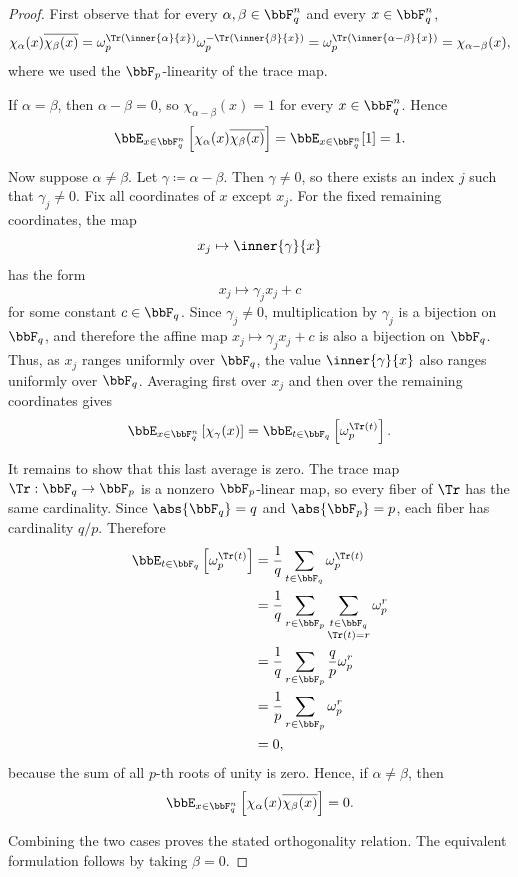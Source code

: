 \begin{proof}\leanok
First observe that for every $\alpha,\beta\in\bbF_q^n$ and every $x\in\bbF_q^n$,
\[
    \chi_\alpha(x)\overline{\chi_\beta(x)}
    =
    \omega_p^{\Tr(\inner{\alpha}{x})}
    \omega_p^{-\Tr(\inner{\beta}{x})}
    =
    \omega_p^{\Tr(\inner{\alpha-\beta}{x})}
    =
    \chi_{\alpha-\beta}(x),
\]
where we used the $\bbF_p$-linearity of the trace map.

If $\alpha=\beta$, then $\alpha-\beta=0$, so $\chi_{\alpha-\beta}(x)=1$ for every
$x\in\bbF_q^n$. Hence
\[
    \bbE_{x\in\bbF_q^n}\left[\chi_\alpha(x)\overline{\chi_\beta(x)}\right]
    =
    \bbE_{x\in\bbF_q^n}[1]
    =
    1.
\]

Now suppose $\alpha\ne\beta$. Let $\gamma \coloneqq \alpha-\beta$. Then $\gamma\ne 0$, so there exists
an index $j$ such that $\gamma_j\ne 0$. Fix all coordinates of $x$ except $x_j$. For the fixed
remaining coordinates, the map
\[
    x_j\mapsto \inner{\gamma}{x}
\]
has the form
\[
    x_j\mapsto \gamma_j x_j + c
\]
for some constant $c\in\bbF_q$. Since $\gamma_j\ne 0$, multiplication by $\gamma_j$ is a
bijection on $\bbF_q$, and therefore the affine map $x_j\mapsto \gamma_jx_j+c$ is also a
bijection on $\bbF_q$. Thus, as $x_j$ ranges uniformly over $\bbF_q$, the value
$\inner{\gamma}{x}$ also ranges uniformly over $\bbF_q$. Averaging first over $x_j$ and then
over the remaining coordinates gives
\[
    \bbE_{x\in\bbF_q^n}\left[\chi_\gamma(x)\right]
    =
    \bbE_{t\in\bbF_q}\left[\omega_p^{\Tr(t)}\right].
\]

It remains to show that this last average is zero. The trace map
$\Tr:\bbF_q\to\bbF_p$ is a nonzero $\bbF_p$-linear map, so every fiber of $\Tr$ has the same
cardinality. Since $\abs{\bbF_q}=q$ and $\abs{\bbF_p}=p$, each fiber has cardinality $q/p$.
Therefore
\begin{align*}
    \bbE_{t\in\bbF_q}\left[\omega_p^{\Tr(t)}\right]
    &=
    \frac{1}{q}\sum_{t\in\bbF_q}\omega_p^{\Tr(t)} \\
    &=
    \frac{1}{q}\sum_{r\in\bbF_p}
        \sum_{\substack{t\in\bbF_q\\ \Tr(t)=r}}
        \omega_p^r \\
    &=
    \frac{1}{q}\sum_{r\in\bbF_p}\frac{q}{p}\omega_p^r \\
    &=
    \frac{1}{p}\sum_{r\in\bbF_p}\omega_p^r \\
    &=0,
\end{align*}
because the sum of all $p$-th roots of unity is zero. Hence, if $\alpha\ne\beta$, then
\[
    \bbE_{x\in\bbF_q^n}\left[\chi_\alpha(x)\overline{\chi_\beta(x)}\right]
    =
    0.
\]

Combining the two cases proves the stated orthogonality relation. The equivalent formulation
follows by taking $\beta=0$.
\end{proof}

